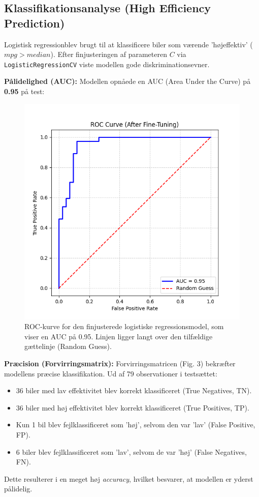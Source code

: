 \documentclass{article}
\begin{document}
\subsection{Klassifikationsanalyse (High Efficiency Prediction)}

Logistisk regressionblev brugt til at klassificere biler som værende 'højeffektiv' (\(mpg > median\)). Efter finjusteringen af parameteren \(C\) via \texttt{LogisticRegressionCV} viste modellen gode diskriminationsevner.

\textbf{Pålidelighed (AUC):} Modellen opnåede en AUC (Area Under the Curve) på \textbf{0.95} på test:

\begin{figure}[h]
    \centering
    \includegraphics[width=0.7\columnwidth]{../models/roc_curve_after_finetuning.png}
    \caption{ROC-kurve for den finjusterede logistiske regressionsmodel, som viser en AUC på 0.95. Linjen ligger langt over den tilfældige gættelinje (Random Guess).}
    \label{fig:roc}
\end{figure}

\textbf{Præcision (Forvirringsmatrix):} Forvirringsmatricen (Fig. 3) bekræfter modellens præcise klassifikation. Ud af 79 observationer i testsættet:
\begin{itemize}
    \item 36 biler med lav effektivitet blev korrekt klassificeret (True Negatives, TN).
    \item 36 biler med høj effektivitet blev korrekt klassificeret (True Positives, TP).
    \item Kun 1 bil blev fejlklassificeret som 'høj', selvom den var 'lav' (False Positive, FP).
    \item 6 biler blev fejlklassificeret som 'lav', selvom de var 'høj' (False Negatives, FN).
\end{itemize}
Dette resulterer i en meget høj \textit{accuracy}, hvilket besvarer, at modellen er yderst pålidelig.
\end{document}

